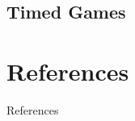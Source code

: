 \documentclass{beamer}
\theoremstyle{definition}
\begin{document}
\subsection{Timed Games}


\nocite{handbook,AlurDill}
\section{References}
\begin{frame}{References}
  
  
\end{frame}
\end{document}
